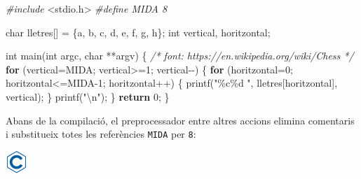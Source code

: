 \documentclass[
]{book}
\newenvironment{Shaded}{\begin{snugshade}}{\end{snugshade}}
\newcommand{\CharTok}[1]{\textcolor[rgb]{0.31,0.60,0.02}{#1}}
\newcommand{\CommentTok}[1]{\textcolor[rgb]{0.56,0.35,0.01}{\textit{#1}}}
\newcommand{\ControlFlowTok}[1]{\textcolor[rgb]{0.13,0.29,0.53}{\textbf{#1}}}
\newcommand{\DataTypeTok}[1]{\textcolor[rgb]{0.13,0.29,0.53}{#1}}
\newcommand{\DecValTok}[1]{\textcolor[rgb]{0.00,0.00,0.81}{#1}}
\newcommand{\ImportTok}[1]{#1}
\newcommand{\NormalTok}[1]{#1}
\newcommand{\PreprocessorTok}[1]{\textcolor[rgb]{0.56,0.35,0.01}{\textit{#1}}}
\newcommand{\SpecialCharTok}[1]{\textcolor[rgb]{0.00,0.00,0.00}{#1}}
\newcommand{\StringTok}[1]{\textcolor[rgb]{0.31,0.60,0.02}{#1}}
\begin{document}
\begin{Shaded}
\begin{Highlighting}[]
\PreprocessorTok{\#include }\ImportTok{\textless{}stdio.h\textgreater{}}
\PreprocessorTok{\#define MIDA 8}

\DataTypeTok{char}\NormalTok{ lletres[] = \{}\CharTok{\textquotesingle{}a\textquotesingle{}}\NormalTok{, }\CharTok{\textquotesingle{}b\textquotesingle{}}\NormalTok{, }\CharTok{\textquotesingle{}c\textquotesingle{}}\NormalTok{, }\CharTok{\textquotesingle{}d\textquotesingle{}}\NormalTok{, }\CharTok{\textquotesingle{}e\textquotesingle{}}\NormalTok{, }\CharTok{\textquotesingle{}f\textquotesingle{}}\NormalTok{, }\CharTok{\textquotesingle{}g\textquotesingle{}}\NormalTok{, }\CharTok{\textquotesingle{}h\textquotesingle{}}\NormalTok{\};}
\DataTypeTok{int}\NormalTok{ vertical, horitzontal;}

\DataTypeTok{int}\NormalTok{ main(}\DataTypeTok{int}\NormalTok{ argc, }\DataTypeTok{char}\NormalTok{ **argv) \{}
    \CommentTok{/* font: https://en.wikipedia.org/wiki/Chess */}
    \ControlFlowTok{for}\NormalTok{ (vertical=MIDA; vertical\textgreater{}=}\DecValTok{1}\NormalTok{; vertical{-}{-}) \{}
        \ControlFlowTok{for}\NormalTok{ (horitzontal=}\DecValTok{0}\NormalTok{; horitzontal\textless{}=MIDA{-}}\DecValTok{1}\NormalTok{; horitzontal++) \{}
\NormalTok{            printf(}\StringTok{"\%c\%d "}\NormalTok{, lletres[horitzontal], vertical);}
\NormalTok{        \}}
\NormalTok{        printf(}\StringTok{"}\SpecialCharTok{\textbackslash{}n}\StringTok{"}\NormalTok{);}
\NormalTok{    \}}
    \ControlFlowTok{return} \DecValTok{0}\NormalTok{;}
\NormalTok{\}}
\end{Highlighting}
\end{Shaded}

Abans de la compilació, el preprocessador entre altres accions elimina comentaris i substitueix totes les referències \texttt{MIDA} per \texttt{8}:

\includegraphics{./img/c.png}
\end{document}
